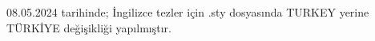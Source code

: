  
08.05.2024 tarihinde; İngilizce tezler için .sty dosyasında TURKEY yerine TÜRKİYE değişikliği yapılmıştır.